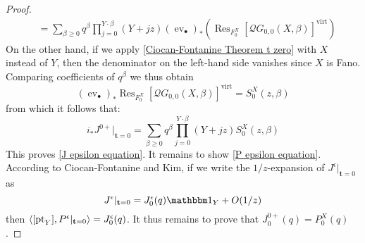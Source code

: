 \documentclass[10pt]{amsart}
\newcommand{\QG}[4]{\mathcal{Q}G_{#1,#2}(#3,#4)}
\newcommand{\virt}[1]{[#1]^{\operatorname{virt}}}
\newcommand{\pt}{\operatorname{pt}}
\newcommand{\ev}{\operatorname{ev}}
\theoremstyle{definition}
\theoremstyle{definition}
\begin{document}
\begin{proof}
\begin{align*}
& = \sum_{\beta \geq 0} q^\beta \prod_{j=0}^{Y \cdot \beta} (Y + jz) (\ev_{\bullet})_* \left( \operatorname{Res}_{F_0^X}\virt{\QG{0}{0}{X}{\beta}} \right) \end{align*}
On the other hand, if we apply \eqref{Ciocan-Fontanine Theorem t zero} with $X$ instead of $Y$, then the denominator on the left-hand side vanishes since $X$ is Fano. Comparing coefficients of $q^\beta$ we thus obtain
\begin{equation*} (\ev_{\bullet})_* \operatorname{Res}_{F_0^X}\virt{\QG{0}{0}{X}{\beta}} = S_0^X(z,\beta) \end{equation*}
from which it follows that:
\begin{equation*} i_*J^{0+}|_{\mathbf{t}=0} = \sum_{\beta \geq 0} q^\beta \prod_{j=0}^{Y\cdot\beta}(Y+jz) S_0^X(z,\beta)\end{equation*}
This proves \eqref{J epsilon equation}. It remains to show \eqref{P epsilon equation}. According to Ciocan-Fontanine and Kim, if we write the $1/z$-expansion of ${J^{\epsilon}}|_{\mathbf{t}=0}$ as
\begin{equation*} {J^{\epsilon}}|_{\mathbf{t}=0}=J^{\epsilon}_{0}(q)\mathbbm 1_Y+O(1/z) \end{equation*}
then $\langle [\pt_Y],  P^\epsilon|_{{\bf t}=0}\rangle=J^{\epsilon}_{0}(q)$. It thus remains to prove that $J^{0+}_0(q)=P_0^X(q)$.


\end{proof}
\end{document}
